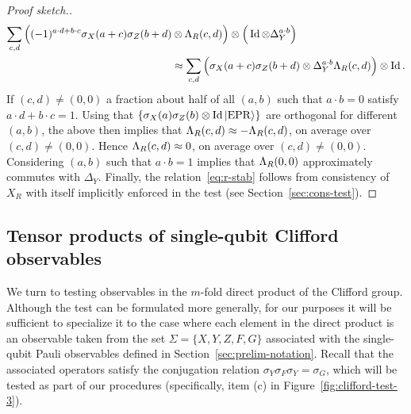 \begin{proof}[Proof sketch.]
\begin{align*}
\sum_{c,d} \Big((-1)^{a\cdot d  +b\cdot c}\sigma_X(a+c)\sigma_Z(b+d) &\otimes \Lambda_R(c,d)\Big) \otimes \Big(\mathop{\rm Id}\nolimits \otimes \Delta_Y^{a\cdot b}\Big)\\
& \approx \sum_{c,d} \Big( \sigma_X(a+c)\sigma_Z(b+d) \otimes \Delta_Y^{a\cdot b } \Lambda_R(c,d)\Big) \otimes \mathop{\rm Id}\nolimits .
\end{align*}
If $(c,d)\neq (0,0)$ a fraction about half of all $(a,b)$ such that $a\cdot b = 0$ satisfy $a\cdot d + b\cdot c = 1$. Using that $\{\sigma_X(a)\sigma_Z(b) \otimes \mathop{\rm Id}\nolimits |{\rm EPR}\rangle\}$ are orthogonal for different $(a,b)$, the above then implies that $\Lambda_R(c,d)\approx -\Lambda_R(c,d)$, on average over $(c,d)\neq (0,0)$. Hence $\Lambda_R(c,d)\approx 0$, on average over $(c,d)\neq (0,0)$. 
Considering $(a,b)$ such that $a\cdot b=1$ implies that $\Lambda_R(0,0)$ approximately commutes with $\Delta_Y$. Finally, the relation~\eqref{eq:r-stab} follows from consistency of $X_R$ with itself implicitly enforced in the test (see Section~\ref{sec:cons-test}).
\end{proof}

\subsection{Tensor products of single-qubit Clifford observables}
\label{sec:n-2-clifford}

We turn to testing observables in the $m$-fold direct product of the Clifford group. Although the test can be formulated more generally, for our purposes it will be sufficient to specialize it to the case where each element in the direct product is an observable taken from the set  $\Sigma = \{X,Y,Z,F,G\}$ associated with the single-qubit Pauli observables defined in Section~\ref{sec:prelim-notation}. Recall that the associated operators satisfy the conjugation relation $\sigma_Y \sigma_F \sigma_Y = \sigma_G$, which will be tested as part of our procedures (specifically, item (c) in Figure~\ref{fig:clifford-test-3}).


